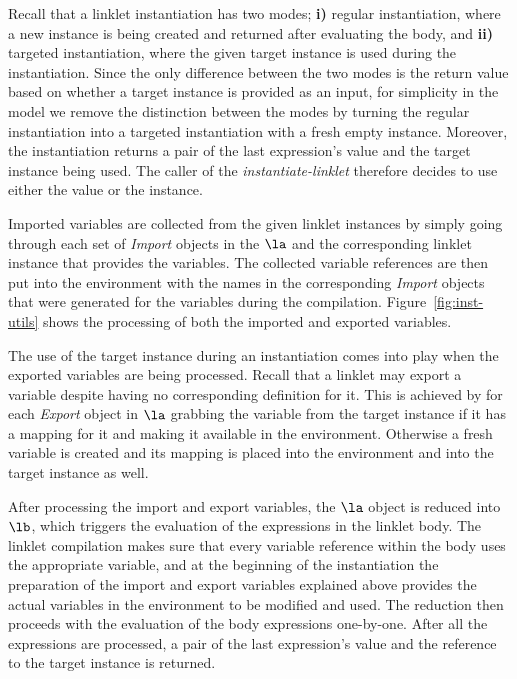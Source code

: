 Recall that a linklet instantiation has two modes; \textbf{i)} regular
instantiation, where a new instance is being created and returned
after evaluating the body, and \textbf{ii)} targeted instantiation,
where the given target instance is used during the
instantiation. Since the only difference between the two modes is the
return value based on whether a target instance is provided as an
input, for simplicity in the model we remove the distinction between
the modes by turning the regular instantiation into a targeted
instantiation with a fresh empty instance. Moreover, the instantiation
returns a pair of the last expression's value and the target instance
being used. The caller of the \emph{instantiate-linklet} therefore
decides to use either the value or the instance.

Imported variables are collected from the given linklet instances by
simply going through each set of \emph{Import} objects in the $\la$
and the corresponding linklet instance that provides the
variables. The collected variable references are then put into the
environment with the names in the corresponding \emph{Import} objects
that were generated for the variables during the
compilation. Figure~\ref{fig:inst-utils} shows the processing of both
the imported and exported variables.

The use of the target instance during an instantiation comes into play
when the exported variables are being processed. Recall that a linklet
may export a variable despite having no corresponding definition for
it. This is achieved by for each \emph{Export} object in $\la$
grabbing the variable from the target instance if it has a mapping for
it and making it available in the environment. Otherwise a fresh
variable is created and its mapping is placed into the environment and
into the target instance as well.

After processing the import and export variables, the $\la$ object is
reduced into $\lb$, which triggers the evaluation of the expressions
in the linklet body. The linklet compilation makes sure that every
variable reference within the body uses the appropriate variable, and
at the beginning of the instantiation the preparation of the import
and export variables explained above provides the actual variables in
the environment to be modified and used. The reduction then proceeds
with the evaluation of the body expressions one-by-one. After all the
expressions are processed, a pair of the last expression's value and
the reference to the target instance is returned.

